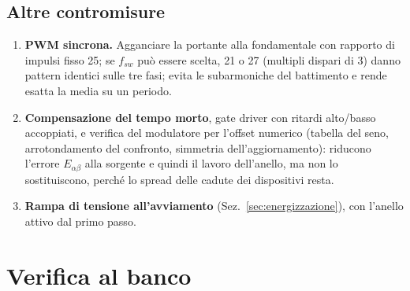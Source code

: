 \documentclass[10pt,a4paper]{scrartcl}
\newcommand{\ab}{\alpha\beta}
\newcommand{\Eab}{E_{\ab}}
\begin{document}
\begin{onehalfspace}
\subsection{Altre contromisure}
\label{sec:altre}

\begin{enumerate}
\item \textbf{PWM sincrona.} Agganciare la portante alla fondamentale con rapporto di impulsi fisso 25; se $f_{sw}$ può essere scelta, 21 o 27 (multipli dispari di 3) danno pattern identici sulle tre fasi; evita le subarmoniche del battimento e rende esatta la media su un periodo.
\item \textbf{Compensazione del tempo morto}, gate driver con ritardi alto/basso accoppiati, e verifica del modulatore per l'offset numerico (tabella del seno, arrotondamento del confronto, simmetria dell'aggiornamento): riducono l'errore $\Eab$ alla sorgente e quindi il lavoro dell'anello, ma non lo sostituiscono, perché lo spread delle cadute dei dispositivi resta.
\item \textbf{Rampa di tensione all'avviamento} (Sez.~\ref{sec:energizzazione}), con l'anello attivo dal primo passo.
\end{enumerate}

\section{Verifica al banco}
\label{sec:banco}


\end{onehalfspace}
\end{document}
